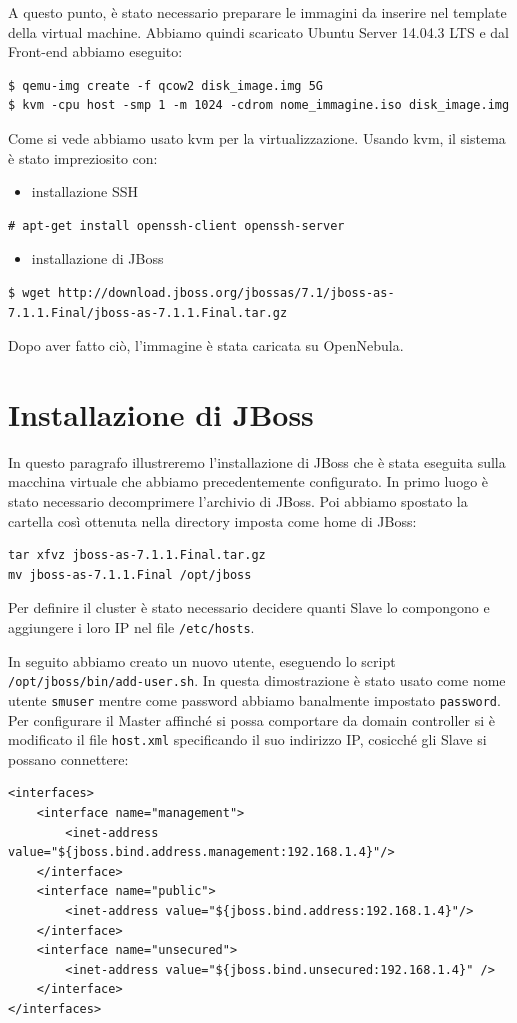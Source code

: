 \documentclass[twoside]{article}
\begin{document}
A questo punto, è stato necessario preparare le immagini da inserire nel template della virtual machine.
Abbiamo quindi scaricato Ubuntu Server 14.04.3 LTS e dal Front-end abbiamo eseguito:
\begin{lstlisting}[frame=trBL]
$ qemu-img create -f qcow2 disk_image.img 5G
$ kvm -cpu host -smp 1 -m 1024 -cdrom nome_immagine.iso disk_image.img
\end{lstlisting}
Come si vede abbiamo usato kvm \cite{bib:kvm} per la virtualizzazione.
\newpage
Usando kvm, il sistema è stato impreziosito con:
\begin{itemize}
	\item installazione SSH
\end{itemize}
\begin{lstlisting}[frame=trBL]
# apt-get install openssh-client openssh-server
\end{lstlisting}
\begin{itemize}
\item installazione di JBoss
\end{itemize}		  
\begin{lstlisting}[frame=trBL]
$ wget http://download.jboss.org/jbossas/7.1/jboss-as-7.1.1.Final/jboss-as-7.1.1.Final.tar.gz		  
\end{lstlisting}
Dopo aver fatto ciò, l'immagine è stata caricata su OpenNebula.

\section{Installazione di JBoss}
In questo paragrafo illustreremo l'installazione di JBoss \cite{bib:jboss}
che è stata eseguita sulla macchina virtuale che abbiamo precedentemente configurato. 
In primo luogo è stato necessario decomprimere l'archivio di JBoss.
Poi abbiamo spostato la cartella così ottenuta nella directory imposta come home di JBoss:
\begin{lstlisting}[frame=trBL]
tar xfvz jboss-as-7.1.1.Final.tar.gz
mv jboss-as-7.1.1.Final /opt/jboss
\end{lstlisting}

Per definire il cluster è stato necessario decidere quanti Slave lo compongono e
aggiungere i loro IP nel file \texttt{/etc/hosts}.

In seguito abbiamo creato un nuovo utente, eseguendo lo script \texttt{/opt/jboss/bin/add-user.sh}.
In questa dimostrazione è stato usato come nome utente \texttt{smuser} mentre come password abbiamo
banalmente impostato \texttt{password}.
Per configurare il Master affinché si possa comportare da domain controller si è modificato il file
\texttt{host.xml} specificando il suo indirizzo IP, cosicché gli Slave si possano connettere:
\begin{lstlisting}[frame=trBL]
<interfaces>
	<interface name="management">
		<inet-address value="${jboss.bind.address.management:192.168.1.4}"/>
	</interface>
	<interface name="public">
		<inet-address value="${jboss.bind.address:192.168.1.4}"/>
	</interface>
	<interface name="unsecured">
		<inet-address value="${jboss.bind.unsecured:192.168.1.4}" />
	</interface>
</interfaces>
\end{lstlisting}
\end{document}
